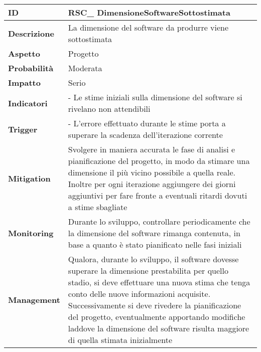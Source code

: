 \begin{tabular}{|p{2.2cm}|p{9.6cm}| }
	\hline
   \textbf{ID} & RSC\_ DimensioneSoftwareSottostimata\\ [0.5ex] 
   \hline
   \textbf{Descrizione} & La dimensione del software da produrre viene sottostimata \\ 
   \hline
   \textbf{Aspetto} &  Progetto \\
   \hline
   \textbf{Probabilità} & Moderata\\ 
   \hline
   \textbf{Impatto} & Serio\\
	\hline
	\textbf{Indicatori} & - Le stime iniziali sulla dimensione del software si rivelano non attendibili \\
	\hline
	\textbf{Trigger} & - L'errore effettuato durante le stime porta a superare la scadenza dell'iterazione corrente\\
   \hline
   \textbf{Mitigation} & Svolgere in maniera accurata le fase di analisi e pianificazione del progetto, in modo da stimare una dimensione il più vicino possibile a quella reale. Inoltre per ogni iterazione aggiungere dei giorni aggiuntivi per fare fronte a eventuali ritardi dovuti a stime sbagliate \\ 
   \hline
   \textbf{Monitoring} & Durante lo sviluppo, controllare periodicamente che la dimensione del software rimanga contenuta, in base a quanto è stato pianificato nelle fasi iniziali\\ 
   \hline
   \textbf{Management} & Qualora, durante lo sviluppo, il software dovesse superare la dimensione prestabilita per quello stadio, si deve effettuare una nuova stima che tenga conto delle nuove informazioni acquisite. Successivamente si deve rivedere la pianificazione del progetto, eventualmente apportando modifiche laddove la dimensione del software risulta maggiore di quella stimata inizialmente \\ 
   \hline
\end{tabular}

